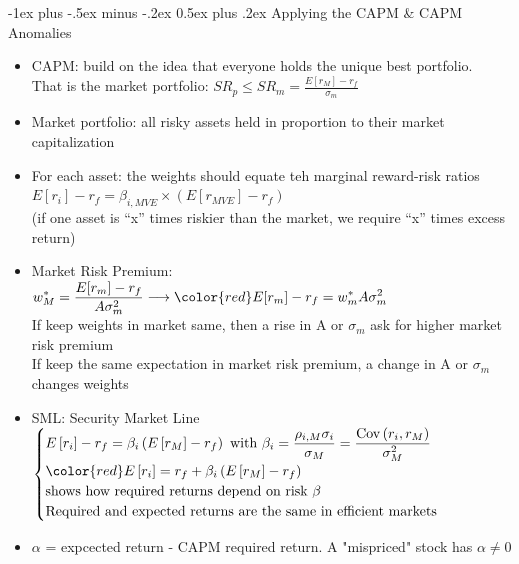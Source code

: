 \documentclass[10pt,landscape]{article}
\makeatletter
\renewcommand{\section}{\@startsection{section}{1}{0mm}%
                                {-1ex plus -.5ex minus -.2ex}%
                                {0.5ex plus .2ex}%
                                {\normalfont\large\bfseries}}
\makeatother
\begin{document}
\begin{multicols}{2}
    \section{Applying the CAPM \& CAPM Anomalies}
    \begin{itemize}
        \item CAPM: build on the idea that everyone holds the unique best portfolio.\\
            That is the market portfolio: $SR_p \leq SR_m = \frac{E[r_M]-r_f}{\sigma_m}$
        \item Market portfolio: all risky assets held in proportion to their market capitalization
        \item For each asset: the weights should equate teh marginal reward-risk ratios\\
            $\displaystyle E[r_i]-r_f = \beta_{i,MVE} \times (E[r_{MVE}] - r_f)$\\
            (if one asset is ``x'' times riskier than the market, we require ``x'' times excess return)
        \item Market Risk Premium: $\displaystyle w_{M}^* = \frac{E[r_m]-r_f}{A\sigma_m^2} \longrightarrow {\color{red}E[r_m]-r_f} = w_m^*A\sigma_m^2$\\
            If keep weights in market same, then a rise in A or $\sigma_m$ ask for higher market risk premium\\
            If keep the same expectation in market risk premium, a change in A or $\sigma_m$ changes weights
        \item SML: Security Market Line
            $
            \begin{cases}
                E\left[r_{i}\right]-r_{f}=\beta_{i}\left(E\left[r_{M}\right]-r_{f}\right) \text{ with } \displaystyle \beta_{i}=\frac{\rho_{i, M} \sigma_{i}}{\sigma_{M}}=\frac{\operatorname{Cov}\left(r_{i}, r_{M}\right)}{\sigma_{M}^{2}}\\
                {\color{red}E\left[r_{i}\right]=r_{f}+\beta_{i}\left(E\left[r_{M}\right]-r_{f}\right)}\\
                \text{shows how required returns depend on risk }\beta\\
                \text{Required and expected returns are the same in efficient markets}\\
            \end{cases}
            $
        \item $\alpha$ = expcected return - CAPM required return. A "mispriced" stock has $\alpha \neq 0$

\end{itemize}
\end{multicols}
\end{document}
